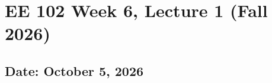 \documentclass{ee102_notes}
\renewcommand{\releasedate}{October 5, 2026}
\begin{document}
\section*{EE 102 Week 6, Lecture 1 (Fall 2026)}
\subsection*{Date: \releasedate}
\tableofcontents

\end{document}
